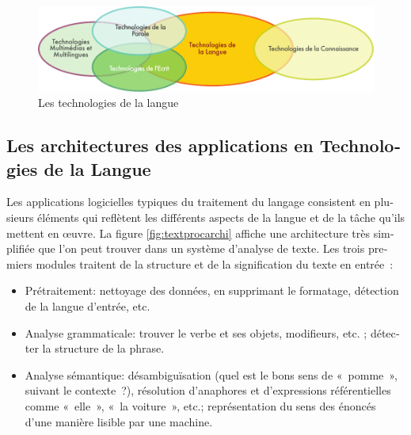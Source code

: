 \begin{french}
\begin{multicols}{2}
\begin{figure}[!ht]

\begin{center}
 \includegraphics[width=\textwidth]{../_media/french/language_technologies} 
\caption{Les technologies de la langue}
\label{fig:languagetechno}
\end{center}
\vspace*{-.2cm}
\end{figure}



\subsection{Les architectures des applications en Technologies de la Langue}

Les applications logicielles typiques du traitement du langage
consistent en plusieurs éléments qui reflètent les différents aspects
de la langue et de la tâche qu'ils mettent en œuvre. La figure \ref{fig:textprocarchi}  
 affiche une architecture très simplifiée que l'on peut trouver
dans un système d'analyse de texte. Les trois premiers modules
traitent de la structure et de la signification du texte en entrée~:
\begin{itemize}
\item Prétraitement: nettoyage des données, en supprimant le
  formatage, détection de la langue d'entrée, etc.

\item Analyse grammaticale: trouver le verbe et ses objets,
  modifieurs, etc. ; détecter la structure de la phrase.

\item Analyse sémantique: désambiguïsation (quel est le bons sens de
  «~pomme~», suivant le contexte~?), résolution d'anaphores et
  d'expressions référentielles comme «~elle~», «~la voiture~», etc.;
  représentation du sens des énoncés d'une manière lisible par une
  machine.
\end{itemize}


\end{multicols}
\end{french}
